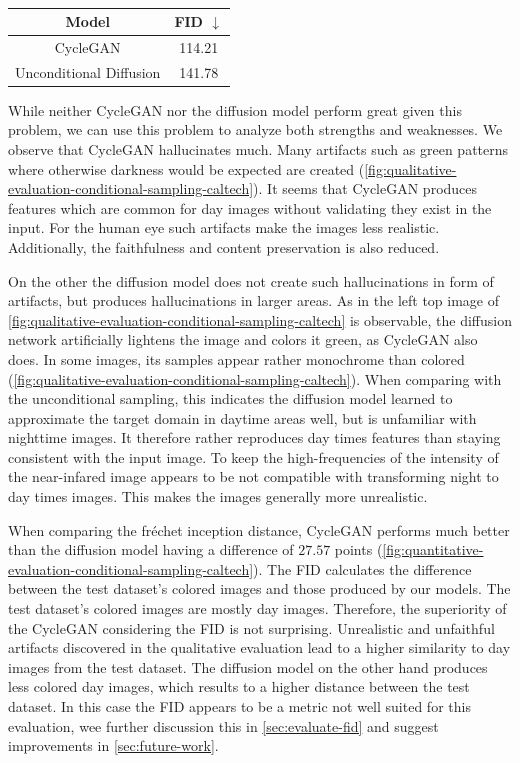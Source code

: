\begin{table}[htp!]
    \centering
    \begin{tabular}{c | c}
        Model                   & FID  $\downarrow$ \\
        \hline\hline
        CycleGAN                & 114.21            \\
        Unconditional Diffusion & 141.78
    \end{tabular}
    \caption{
    }
    \label{fig:quantitative-evaluation-conditional-sampling-caltech}
\end{table}

While neither CycleGAN nor the diffusion model perform great given this problem, we can use this problem to analyze both strengths and weaknesses.
We observe that CycleGAN hallucinates much.
Many artifacts such as green patterns where otherwise darkness would be expected are created (\autoref{fig:qualitative-evaluation-conditional-sampling-caltech}).
It seems that CycleGAN produces features which are common for day images without validating they exist in the input.
For the human eye such artifacts make the images less realistic. Additionally, the faithfulness and content preservation is also reduced.

On the other the diffusion model does not create such hallucinations in form of artifacts, but produces hallucinations in larger areas.
As in the left top image of \autoref{fig:qualitative-evaluation-conditional-sampling-caltech} is observable, the diffusion network artificially lightens the image and colors it green, as CycleGAN also does.
In some images, its samples appear rather monochrome than colored (\autoref{fig:qualitative-evaluation-conditional-sampling-caltech}).
When comparing with the unconditional sampling, this indicates the diffusion model learned to approximate the target domain in daytime areas well, but is unfamiliar with nighttime images.
It therefore rather reproduces day times features than staying consistent with the input image.
To keep the high-frequencies of the intensity of the near-infared image appears to be not compatible with transforming night to day times images.
This makes the images generally more unrealistic.

When comparing the fréchet inception distance, CycleGAN performs much better than the diffusion model having a difference of $27.57$ points (\autoref{fig:quantitative-evaluation-conditional-sampling-caltech}).
The FID calculates the difference between the test dataset's colored images and those produced by our models.
The test dataset's colored images are mostly day images.
Therefore, the superiority of the CycleGAN considering the FID is not surprising.
Unrealistic and unfaithful artifacts discovered in the qualitative evaluation lead to a higher similarity to day images from the test dataset.
The diffusion model on the other hand produces less colored day images, which results to a higher distance between the test dataset.
In this case the FID appears to be a metric not well suited for this evaluation, wee further discussion this in \autoref{sec:evaluate-fid} and suggest improvements in \autoref{sec:future-work}.

